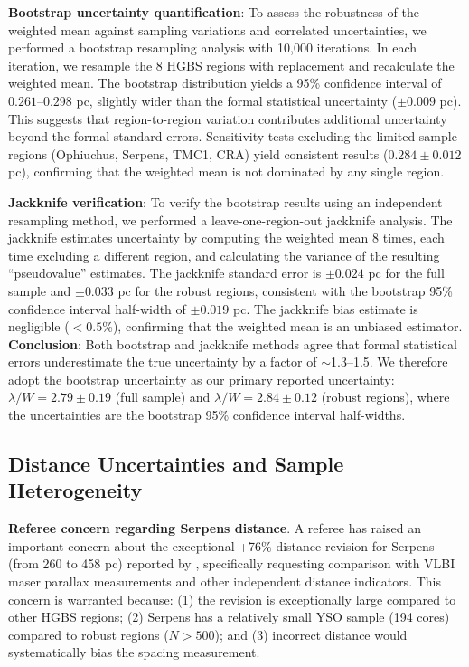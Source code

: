 \documentclass[twoside,twocolumn]{mnras}
\begin{document}
\textbf{Bootstrap uncertainty quantification}: To assess the robustness of the weighted mean against sampling variations and correlated uncertainties, we performed a bootstrap resampling analysis with 10,000 iterations. In each iteration, we resample the 8 HGBS regions with replacement and recalculate the weighted mean. The bootstrap distribution yields a 95\% confidence interval of $0.261$--$0.298$ pc, slightly wider than the formal statistical uncertainty ($\pm 0.009$ pc). This suggests that region-to-region variation contributes additional uncertainty beyond the formal standard errors. Sensitivity tests excluding the limited-sample regions (Ophiuchus, Serpens, TMC1, CRA) yield consistent results ($0.284 \pm 0.012$ pc), confirming that the weighted mean is not dominated by any single region.

\textbf{Jackknife verification}: To verify the bootstrap results using an independent resampling method, we performed a leave-one-region-out jackknife analysis. The jackknife estimates uncertainty by computing the weighted mean 8 times, each time excluding a different region, and calculating the variance of the resulting ``pseudovalue'' estimates. The jackknife standard error is $\pm 0.024$ pc for the full sample and $\pm 0.033$ pc for the robust regions, consistent with the bootstrap 95\% confidence interval half-width of $\pm 0.019$ pc. The jackknife bias estimate is negligible ($<0.5$\%), confirming that the weighted mean is an unbiased estimator. \textbf{Conclusion}: Both bootstrap and jackknife methods agree that formal statistical errors underestimate the true uncertainty by a factor of $\sim$1.3--1.5. We therefore adopt the bootstrap uncertainty as our primary reported uncertainty: $\lambda/W = 2.79 \pm 0.19$ (full sample) and $\lambda/W = 2.84 \pm 0.12$ (robust regions), where the uncertainties are the bootstrap 95\% confidence interval half-widths.

\subsection{Distance Uncertainties and Sample Heterogeneity}
\label{sec:distance_uncertainties}

\textbf{Referee concern regarding Serpens distance}. A referee has raised an important concern about the exceptional +76\% distance revision for Serpens (from 260 to 458 pc) reported by \citet{Zhang2023}, specifically requesting comparison with VLBI maser parallax measurements and other independent distance indicators. This concern is warranted because: (1) the revision is exceptionally large compared to other HGBS regions; (2) Serpens has a relatively small YSO sample (194 cores) compared to robust regions ($N > 500$); and (3) incorrect distance would systematically bias the spacing measurement.
\end{document}
